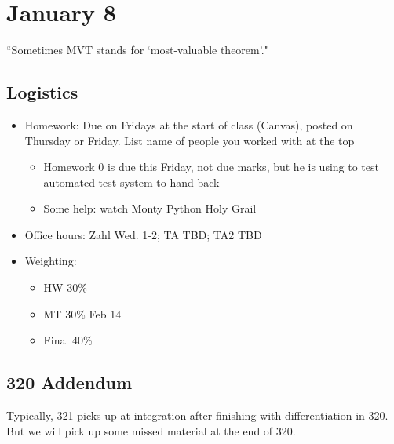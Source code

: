 \documentclass{article}
\theoremstyle{plain}
\theoremstyle{remark}
\begin{document}
\section{January 8}
``Sometimes MVT stands for `most-valuable theorem'."
\subsection{Logistics}
\begin{itemize}
	\item Homework: Due on Fridays at the start of class (Canvas), posted on Thursday or Friday.
		List name of people you worked with at the top
		\begin{itemize}
			\item Homework 0 is due this Friday, not due marks,
				but he is using to test automated test system to hand back
			\item Some help: watch Monty Python Holy Grail
		\end{itemize}
	\item Office hours: Zahl Wed. 1-2; TA TBD; TA2 TBD
	\item Weighting:
		\begin{itemize}
			\item HW 30\%
			\item MT 30\% Feb 14
			\item Final 40\%
		\end{itemize}
\end{itemize}

\subsection*{320 Addendum}
Typically, 321 picks up at integration after finishing with differentiation in 320.
But we will pick up some missed material at the end of 320.
\end{document}
